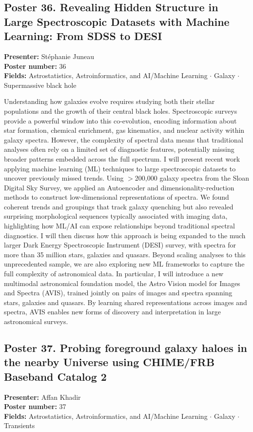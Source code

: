 \hypertarget{poster-abstract-talk-294}{}\label{poster-abstract-page-talk-294}
\subsection*{Poster 36. Revealing Hidden Structure in Large Spectroscopic Datasets with Machine Learning: From SDSS to DESI}
\textbf{Presenter:} Stéphanie Juneau\\
\textbf{Poster number:} 36\\
\textbf{Fields:} Astrostatistics, Astroinformatics, and AI/Machine Learning $\cdot$ Galaxy $\cdot$ Supermassive black hole

Understanding how galaxies evolve requires studying both their stellar populations and the growth of their central black holes. Spectroscopic surveys provide a powerful window into this co-evolution, encoding information about star formation, chemical enrichment, gas kinematics, and nuclear activity within galaxy spectra. However, the complexity of spectral data means that traditional analyses often rely on a limited set of diagnostic features, potentially missing broader patterns embedded across the full spectrum. I will present recent work applying machine learning (ML) techniques to large spectroscopic datasets to uncover previously missed trends. Using $>$200,000 galaxy spectra from the Sloan Digital Sky Survey, we applied an Autoencoder and dimensionality-reduction methods to construct low-dimensional representations of spectra. We found coherent trends and groupings that track galaxy quenching but also revealed surprising morphological sequences typically associated with imaging data, highlighting how ML/AI can expose relationships beyond traditional spectral diagnostics. I will then discuss how this approach is being expanded to the much larger Dark Energy Spectroscopic Instrument (DESI) survey, with spectra for more than 35 million stars, galaxies and quasars. Beyond scaling analyses to this unprecedented sample, we are also exploring new ML frameworks to capture the full complexity of astronomical data. In particular, I will introduce a new multimodal astronomical foundation model, the Astro Vision model for Images and Spectra (AVIS), trained jointly on pairs of images and spectra spanning stars, galaxies and quasars. By learning shared representations across images and spectra, AVIS enables new forms of discovery and interpretation in large astronomical surveys.

\hypertarget{poster-abstract-talk-98}{}\label{poster-abstract-page-talk-98}
\subsection*{Poster 37. Probing foreground galaxy haloes in the nearby Universe using CHIME/FRB Baseband Catalog 2}
\textbf{Presenter:} Affan Khadir\\
\textbf{Poster number:} 37\\
\textbf{Fields:} Astrostatistics, Astroinformatics, and AI/Machine Learning $\cdot$ Galaxy $\cdot$ Transients

